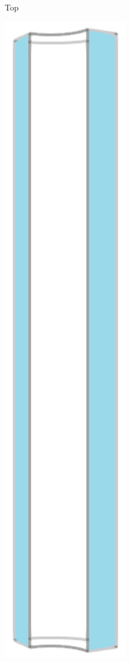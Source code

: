 \begin{figure}[!htb]
\begin{subfigure}[b]{0.16\textwidth}
    \caption{Top}
  \end{subfigure}
  \begin{subfigure}[b]{0.16\textwidth}
    \centering
    \includegraphics[width=0.6\textwidth]{Chapter5/figures/spallation/geometry_sides}

\end{subfigure}
\end{figure}
